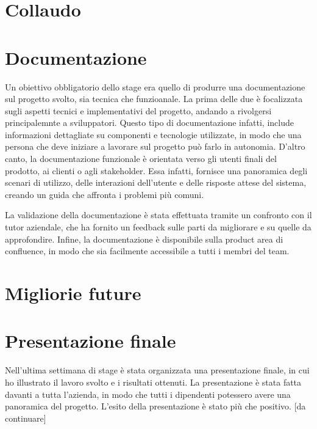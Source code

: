 \section{Collaudo}
\section{Documentazione}
Un obiettivo obbligatorio dello stage era quello di produrre una documentazione sul progetto svolto, sia tecnica che funzioanale.
La prima delle due è focalizzata sugli aspetti tecnici e implementativi del progetto, andando a rivolgersi principalemnte a sviluppatori.
Questo tipo di documentazione infatti, include informazioni dettagliate su componenti e tecnologie utilizzate, in modo che una persona che deve iniziare a lavorare sul progetto
può farlo in autonomia.
D'altro canto, la documentazione funzionale è orientata verso gli utenti finali del prodotto, ai clienti o agli stakeholder.
Essa infatti, fornisce una panoramica degli scenari di utilizzo, delle interazioni dell'utente e delle risposte attese del sistema, creando un guida che affronta i problemi più comuni.


La validazione della documentazione è stata effettuata tramite un confronto con il tutor aziendale, che ha fornito un feedback sulle parti da migliorare e su quelle da approfondire.
Infine, la documentazione è disponibile sulla product area di confluence, in modo che sia facilmente accessibile a tutti i membri del team.

\section{Migliorie future}
\section{Presentazione finale}
Nell'ultima settimana di stage è stata organizzata una presentazione finale, in cui ho illustrato il lavoro svolto e i risultati ottenuti.
La presentazione è stata fatta davanti a tutta l'azienda, in modo che tutti i dipendenti potessero avere una panoramica del progetto.
L'esito della presentazione è stato più che positivo. [da continuare]








